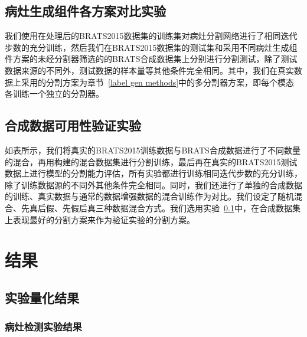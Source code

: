 \documentclass[letterpaper]{article} %
\begin{document}
\subsection{病灶生成组件各方案对比实验}
\label{label gen methods tests}
我们使用在处理后的BRATS2015数据集的训练集对病灶分割网络进行了相同迭代步数的充分训练，然后我们在BRATS2015数据集的测试集和采用不同病灶生成组件方案的未经分割器筛选的的BRATS合成数据集上分别进行分割测试，除了测试数据来源的不同外，测试数据的样本量等其他条件完全相同。其中，我们在真实数据上采用的分割方案为章节~\ref{label gen methods}中的多分割器方案，即每个模态各训练一个独立的分割器。

\subsection{合成数据可用性验证实验}
如表所示，我们将真实的BRATS2015训练数据与BRATS合成数据进行了不同数量的混合，再用构建的混合数据集进行分割训练，最后再在真实的BRATS2015测试数据上进行模型的分割能力评估，所有实验都进行训练相同迭代步数的充分训练，除了训练数据源的不同外其他条件完全相同。同时，我们还进行了单独的合成数据的训练、真实数据与通常的数据增强数据的混合训练作为对比。我们设定了随机混合、先真后假、先假后真三种数据混合方式。我们选用实验~\ref{label gen methods tests}中，在合成数据集上表现最好的分割方案来作为验证实验的分割方案。

\section{结果}
\subsection{实验量化结果}

\subsubsection{病灶检测实验结果}
\begin{table}[t]
	\caption{病灶检测实验结果.}\smallskip
	\centering
	\label{label_test}	
\end{table}
\end{document}
